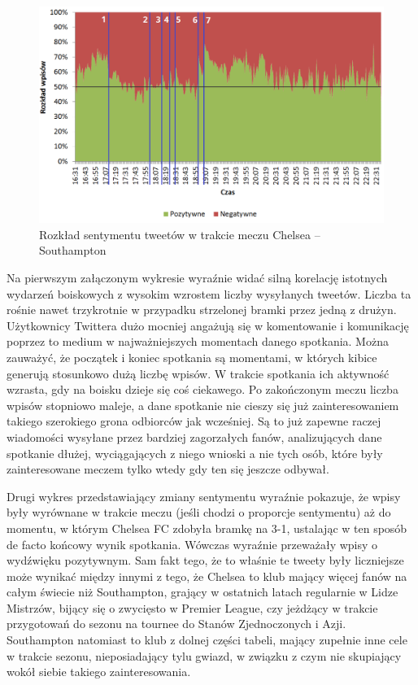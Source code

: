 \begin{figure}[ht!]
\centering
\includegraphics[width=120mm]{img/sentyment-w-meczu-nums-50percentage.png}
\caption{Rozkład sentymentu tweetów w trakcie meczu Chelsea -- Southampton}
\label{image:sentyment-w-meczu}
\end{figure}


Na pierwszym załączonym wykresie  wyraźnie widać
silną korelację istotnych wydarzeń boiskowych z wysokim wzrostem liczby wysyłanych tweetów. 
Liczba ta rośnie nawet trzykrotnie w przypadku strzelonej bramki przez jedną
z drużyn. Użytkownicy Twittera dużo mocniej angażują się w komentowanie i 
komunikację poprzez to medium w najważniejszych momentach danego spotkania.
Można zauważyć, że początek i koniec spotkania są momentami, w których
kibice generują stosunkowo dużą liczbę wpisów. W trakcie spotkania
ich aktywność wzrasta, gdy na boisku dzieje się coś ciekawego.
Po zakończonym meczu liczba wpisów stopniowo maleje, a dane spotkanie
nie cieszy się już zainteresowaniem takiego szerokiego grona
odbiorców jak wcześniej. Są to już zapewne raczej wiadomości wysyłane
przez bardziej zagorzałych fanów, analizujących dane spotkanie dłużej,
wyciągających z niego wnioski a nie tych osób, które były zainteresowane
meczem tylko wtedy gdy ten się jeszcze odbywał.

Drugi wykres  przedstawiający zmiany sentymentu
wyraźnie pokazuje, że wpisy były wyrównane w trakcie meczu (jeśli chodzi o proporcje sentymentu) aż do momentu,
w którym Chelsea FC zdobyła bramkę na 3-1, ustalając w ten sposób de facto
końcowy wynik spotkania. Wówczas wyraźnie przeważały wpisy o wydźwięku
pozytywnym. Sam fakt tego, że to właśnie te tweety były liczniejsze może wynikać
między innymi z tego, że Chelsea to klub mający więcej fanów na całym świecie
niż Southampton, grający w ostatnich latach regularnie w Lidze Mistrzów, bijący
się o zwycięsto w Premier League, czy jeżdżący w trakcie przygotowań do sezonu
na tournee do Stanów Zjednoczonych i Azji. Southampton natomiast to klub z dolnej
części tabeli, mający zupełnie inne cele w trakcie sezonu, nieposiadający tylu
gwiazd, w związku z czym nie skupiający wokół siebie takiego zainteresowania.

